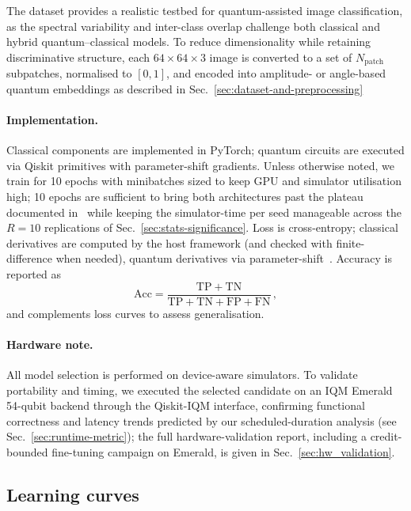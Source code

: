 The dataset provides a realistic testbed for quantum-assisted image classification,
as the spectral variability and inter-class overlap challenge both classical
and hybrid quantum--classical models.
To reduce dimensionality while retaining discriminative structure, each
$64\times64\times3$ image is converted to a set of $N_\mathrm{patch}$ subpatches,
normalised to $[0,1]$, and encoded into amplitude- or angle-based quantum embeddings
as described in Sec.~\ref{sec:dataset-and-preprocessing}

\paragraph{Implementation.}
Classical components are implemented in PyTorch; quantum circuits are executed via Qiskit primitives with parameter-shift gradients. Unless otherwise noted, we train for 10 epochs with minibatches sized to keep GPU and simulator utilisation high; 10 epochs are sufficient to bring both architectures past the plateau documented in~\cite{Filippi2025Thesis} while keeping the simulator-time per seed manageable across the $R=10$ replications of Sec.~\ref{sec:stats-significance}. Loss is cross-entropy; classical derivatives are computed by the host framework (and checked with finite-difference when needed), quantum derivatives via parameter-shift~\cite{Schuld2019Grad}. Accuracy is reported as
\begin{equation}
\mathrm{Acc}=\frac{\mathrm{TP}+\mathrm{TN}}{\mathrm{TP}+\mathrm{TN}+\mathrm{FP}+\mathrm{FN}}\,,
\end{equation}
and complements loss curves to assess generalisation.

\paragraph{Hardware note.}
All model selection is performed on device-aware simulators. To validate portability and timing, we executed the selected candidate on an IQM Emerald 54-qubit backend through the Qiskit-IQM interface, confirming functional correctness and latency trends predicted by our scheduled-duration analysis (see Sec.~\ref{sec:runtime-metric}); the full hardware-validation report, including a credit-bounded fine-tuning campaign on Emerald, is given in Sec.~\ref{sec:hw_validation}.

\subsection{Learning curves}
\label{sec:results-curves}

